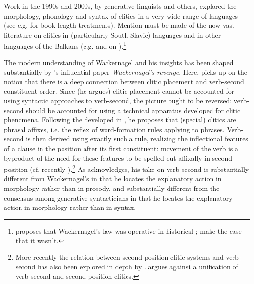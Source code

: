 Work in the 1990s and 2000s, by generative linguists and others, explored the morphology, phonology and syntax of clitics in a very wide range of languages (see e.g. \citealp{HalpernZwicky1996,BeukemaDenDikken2000,FranksKing2000,GerlachGrijzenhout2000,Boskovic2001,Anderson2005,Roberts2010,SpencerLuis2012,SalvesenHelland2013} for book-length treatments). Mention must be made of the now vast literature on clitics in  (particularly South Slavic) languages \citep{RadanovicKocic1988,RadanovicKocic1996,NevisJoseph1993,Schuetze1994,DimitrovaVulchanova1995,DimitrovaVulchanova1998,Progovac1996,Progovac2000,Tomic1996,Tomic2000,Franks1997,Franks2000,Franks2008,FranksBoskovic2001,FranksKing2000,Boskovic2000,Boskovic2001,Boskovic2002,Boskovic2016,Pancheva2005,Migdalski2010,Migdalski2012,Migdalski2016,DiesingZec2011,Harizanov2014,Despic2017} and in other languages of the Balkans (e.g. \citealp{Francu2009} and \citealp{AlboiuHill2012} on ).\footnote{\citet{Francu2009} proposes that Wackernagel's law was operative in historical ; \citet{AlboiuHill2012} make the case that it wasn't.}

The modern understanding of Wackernagel and his insights has been shaped substantially by \citeauthor{Anderson1993}'s \citeyearpar{Anderson1993} influential paper \textit{Wackernagel's revenge}. Here, \citeauthor{Anderson1993} picks up on the notion that there is a deep connection between clitic placement and verb-second constituent order. Since (he argues) clitic placement cannot be accounted for using syntactic approaches to verb-second, the picture ought to be reversed: verb-second should be accounted for using a technical apparatus developed for clitic phenomena. Following the  developed in \citet{Anderson1992}, he proposes that (special) clitics are phrasal affixes, i.e. the reflex of word-formation rules applying to phrases. Verb-second is then derived using exactly such a rule, realizing the inflectional features of a clause in the position after its first constituent: movement of the verb is a byproduct of the need for these features to be spelled out affixally in second position (cf. recently \citealp{BayerFreitag2020}).\footnote{More recently the relation between second-position clitic systems and verb-second has also been explored in depth by \citet{Migdalski2010,Migdalski2016}. \citet{Boskovic2020} argues against a unification of verb-second and second-position clitics.} As \citeauthor{Anderson1993} acknowledges, his take on verb-second is substantially different from Wackernagel's in that he locates the explanatory action in morphology rather than in prosody, and substantially different from the consensus among generative syntacticians in that he locates the explanatory action in morphology rather than in syntax.

